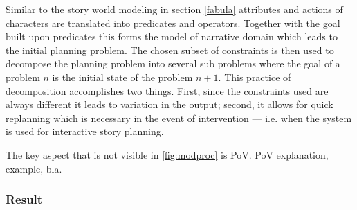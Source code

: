 Similar to the story world modeling in section \ref{fabula} attributes and actions of characters are translated into predicates and operators. Together with the goal built upon predicates this forms the model of narrative domain which leads to the initial planning problem. The chosen subset of constraints is then used to decompose the planning problem into several sub problems where the goal of a problem $n$ is the initial state of the problem $n+1$. This practice of decomposition accomplishes two things. First, since the constraints used are always different it leads to variation in the output; second, it allows for quick replanning which is necessary in the event of intervention --- i.e. when the system is used for interactive story planning.

The key aspect that is not visible in \ref{fig:modproc} is PoV. PoV explanation, example, bla.
\subsubsection{Result}
